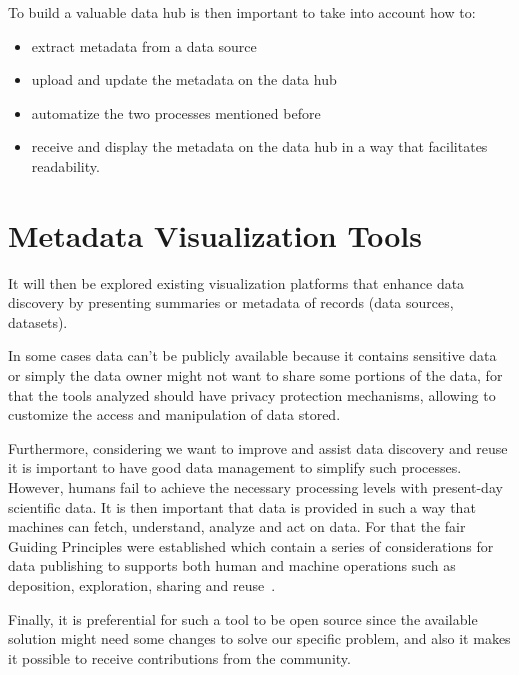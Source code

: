 To build a valuable data hub is then important to take into account how to:
\begin{itemize}
    \item extract metadata from a data source
    \item upload and update the metadata on the data hub
    \item automatize the two processes mentioned before
    \item receive and display the metadata on the data hub in a way that facilitates
        readability.
\end{itemize}

\section{Metadata Visualization Tools} \label{sec:viz-tools}


It will then be explored existing visualization platforms that enhance data discovery
by presenting summaries or metadata of records (data sources, datasets).

In some cases data can't be publicly available because it contains sensitive data or
simply the data owner might not want to share some portions of the data, for that the
tools analyzed should have privacy protection mechanisms, allowing to customize the
access and manipulation of data stored.

Furthermore, considering we want to improve and assist data discovery and reuse it is
important to have good data management to simplify such processes.
However, humans fail to achieve the necessary processing levels with present-day
scientific data.
It is then important that data is provided in such a way that machines can fetch,
understand, analyze and act on data.
For that the \gls{fair} Guiding Principles were established which contain a series of
considerations for data publishing to supports both human and machine operations such
as deposition, exploration, sharing and reuse~\cite{fair}.


Finally, it is preferential for such a tool to be open source since the available
solution might need some changes to solve our specific problem, and also it makes it
possible to receive contributions from the community.


